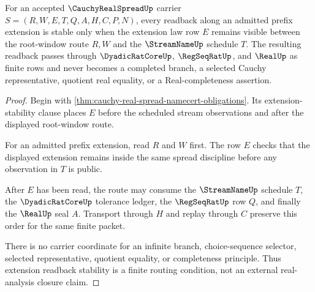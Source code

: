 \begin{theorem}
\label{thm:cauchy-real-spread-extension-readback-stability}
For an accepted $\CauchyRealSpreadUp$ carrier $S=(R,W,E,T,Q,A,H,C,P,N)$, every readback along an admitted prefix extension is stable only when the extension law row $E$ remains visible between the root-window route $R,W$ and the $\StreamNameUp$ schedule $T$. The resulting readback passes through $\DyadicRatCoreUp$, $\RegSeqRatUp$, and $\RealUp$ as finite rows and never becomes a completed branch, a selected Cauchy representative, quotient real equality, or a Real-completeness assertion.
\end{theorem}
\begin{proof}
Begin with \autoref{thm:cauchy-real-spread-namecert-obligations}. Its extension-stability clause places $E$ before the scheduled stream observations and after the displayed root-window route.

For an admitted prefix extension, read $R$ and $W$ first. The row $E$ checks that the displayed extension remains inside the same spread discipline before any observation in $T$ is public.

After $E$ has been read, the route may consume the $\StreamNameUp$ schedule $T$, the $\DyadicRatCoreUp$ tolerance ledger, the $\RegSeqRatUp$ row $Q$, and finally the $\RealUp$ seal $A$. Transport through $H$ and replay through $C$ preserve this order for the same finite packet.

There is no carrier coordinate for an infinite branch, choice-sequence selector, selected representative, quotient equality, or completeness principle. Thus extension readback stability is a finite routing condition, not an external real-analysis closure claim.
\end{proof}

